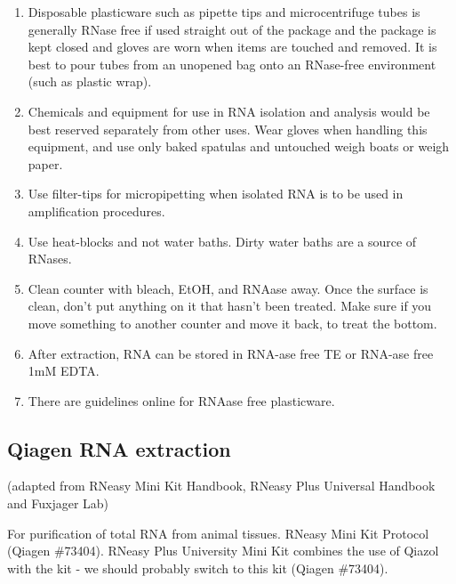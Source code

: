 \documentclass[11pt, oneside]{article}
\begin{document}
\begin{enumerate}
			\item Disposable plasticware such as pipette tips and microcentrifuge tubes is generally RNase free if used straight out of the package and 			the package is kept closed and gloves are worn when items are touched and removed. It is best to pour tubes from an unopened bag onto an 			RNase-free environment (such as plastic wrap). 

			\item Chemicals and equipment for use in RNA isolation and analysis would be best reserved separately from other uses. Wear gloves when 			handling this equipment, and use only baked spatulas and untouched weigh boats or weigh paper. 

			\item Use filter-tips for micropipetting when isolated RNA is to be used in amplification procedures. 

			\item Use heat-blocks and not water baths. Dirty water baths are a source of RNases. 

			\item Clean counter with bleach, EtOH, and RNAase away. Once the surface is clean, don't put anything on it that hasn't been treated.  Make sure if you move something to another counter and move it back, to treat the bottom.
			
			\item After extraction, RNA can be stored in RNA-ase free TE or RNA-ase free 1mM EDTA.
			
			\item There are guidelines online for RNAase free plasticware.

 		\end{enumerate}
			
		\newpage

	\subsection{Qiagen RNA extraction} 
	
		\noindent (adapted from RNeasy Mini Kit Handbook, RNeasy Plus Universal Handbook and Fuxjager Lab)
	
		\vspace{5mm}

		\noindent For purification of total RNA from animal tissues. RNeasy Mini Kit Protocol (Qiagen \#73404). RNeasy Plus University Mini Kit combines 		the use of Qiazol with the kit - we should probably switch to this kit (Qiagen \#73404). 
	
\end{document}
